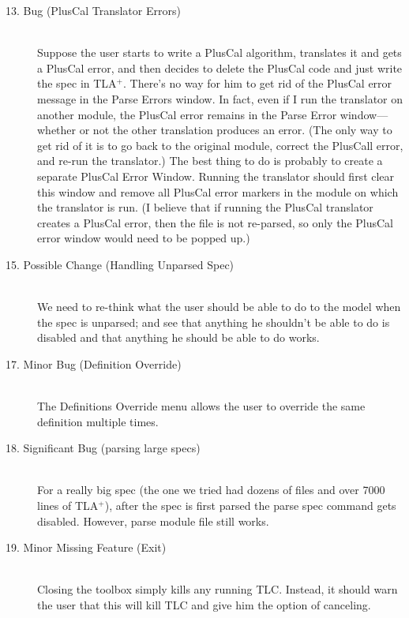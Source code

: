 \documentclass{article}
\newcommand{\TLA}[1]{TLA$^{+}$}
\begin{document}
\begin{description}
\item[13. Bug (PlusCal Translator Errors)] \mbox{}\\
%
Suppose the user starts to write a PlusCal algorithm, translates it
and gets a PlusCal error, and then decides to delete the PlusCal code
and just write the spec in \TLA+.  There's no way for him to get rid of
the PlusCal error message in the Parse Errors window.  In fact, even
if I run the translator on another module, the PlusCal error remains
in the Parse Error window---whether or not the other translation
produces an error.  (The only way to get rid of it is to go back to
the original module, correct the PlusCall error, and re-run the
translator.)  The best thing to do is probably to create a separate
PlusCal Error Window.  Running the translator should first clear this
window and remove all PlusCal error markers in the module on which the
translator is run.  (I believe that if running the PlusCal translator
creates a PlusCal error, then the file is not re-parsed, so only the
PlusCal error window would need to be popped up.)

\item[15. Possible Change (Handling Unparsed Spec)] \mbox{}\\
%
We need to re-think what the user should be able to do to the model
when the spec is unparsed; and see that anything he shouldn't be able
to do is disabled and that anything he should be able to do works.

\item[17. Minor Bug (Definition Override)] \mbox{}\\
%
The Definitions Override menu allows the user to override the same
definition multiple times. 

\item[18. Significant Bug (parsing large specs)] \mbox{}\\
%
For a really big spec (the one we tried had dozens of files and over
7000 lines of \TLA+), after the spec is first parsed the parse spec
command gets disabled.  However, parse module file still works.  

\item[19. Minor Missing Feature (Exit)] \mbox{}\\
%
Closing the toolbox simply kills any running TLC. Instead, it should
warn the user that this will kill TLC and give him the option of
canceling. 


\end{description}
\end{document}
